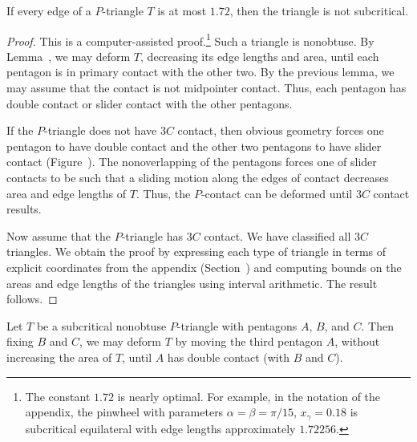\begin{lemma}
  If every edge of a $P$-triangle $T$ is at most $1.72$, then the
  triangle is not subcritical.
\end{lemma}

\begin{proof} This is a computer-assisted proof.\footnote{The constant
    $1.72$ is nearly optimal.  For example, in the notation of the
    appendix, the pinwheel with parameters $\alpha=\beta=\pi/15$,
    $x_\gamma = 0.18$ is subcritical equilateral with edge lengths
    approximately $1.72256$.} Such a triangle is nonobtuse.  By
  Lemma~, we may deform $T$, decreasing its
  edge lengths and area, until each pentagon is in primary contact
  with the other two.  By the previous lemma, we may assume that the
  contact is not midpointer contact.  Thus, each pentagon has double
  contact or slider contact with the other pentagons.

  If the $P$-triangle does not have $3C$ contact, then obvious
  geometry forces one pentagon to have double contact and the other
  two pentagons to have slider contact (Figure~).
  The nonoverlapping of the pentagons forces one of slider contacts to
  be such that a sliding motion along the edges of contact decreases
  area and edge lengths of $T$.  Thus, the $P$-contact can be deformed
  until $3C$ contact results.



Now assume that the $P$-triangle has $3C$ contact.  We have classified
all $3C$ triangles.  We obtain the proof by expressing each type of
triangle in terms of explicit coordinates from the appendix
(Section~) and computing bounds on the areas and
edge lengths of the triangles using interval arithmetic.  The result
follows.
\end{proof}

\begin{lemma} 
  Let $T$ be a subcritical nonobtuse $P$-triangle with pentagons $A$,
  $B$, and $C$.  Then fixing $B$ and $C$, we may deform $T$ by moving
  the third pentagon $A$, without increasing the area of $T$, until
  $A$ has double contact (with $B$ and $C$).
\end{lemma}

